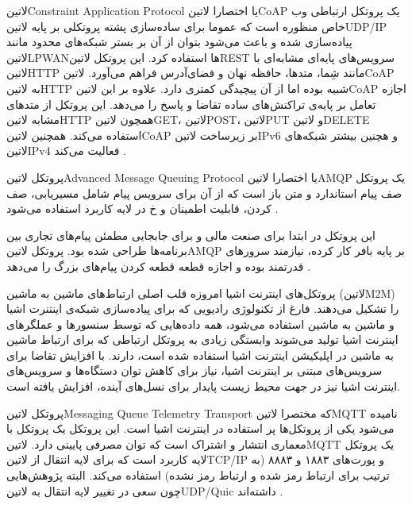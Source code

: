 
‌لاتین{Constraint Application Protocol} یا اختصارا ‌لاتین{CoAP}
یک پروتکل ارتباطی وب خاص منظوره است که عموما برای ساده‌سازی پشته پروتکلی بر پایه ‌لاتین{UDP/IP} پیاده‌سازی شده
و باعث می‌شود بتوان از آن بر بستر شبکه‌های محدود مانند ‌لاتین{LPWAN}ها استفاده کرد.
این پروتکل ‌لاتین{REST} سرویس‌های پایه‌ای مشابه‌ای با ‌لاتین{HTTP} مانند شِما، متدها، حافظه نهان و فضای‌آدرس فراهم می‌آورد.
‌لاتین{CoAP} به ‌لاتین{HTTP} شبیه بوده اما از آن پیچیدگی کمتری دارد.
علاوه بر این ‌لاتین{CoAP} اجازه تعامل بر پایه‌ی تراکنش‌های ساده تقاضا و پاسخ را می‌دهد.
این پروتکل از متدهای مشابه ‌لاتین{HTTP} همچون ‌لاتین{GET}، ‌لاتین{POST}، ‌لاتین{PUT} و ‌لاتین{DELETE} استفاده می‌کند.
همچنین ‌لاتین{CoAP} بر زیرساخت ‌لاتین{IPv6} و هچنین بیشتر شبکه‌های ‌لاتین{IPv4} فعالیت می‌کند
.


پروتکل ‌لاتین{Advanced Message Queuing Protocol} یا اختصارا ‌لاتین{AMQP} یک پروتکل صف پیام استاندارد و متن باز است
که از آن برای سرویس پیام شامل مسیریابی، صف کردن، قابلیت اطمینان و ‌خ در لایه کاربرد استفاده می‌شود
.

این پروتکل در ابتدا برای صنعت مالی و برای جابجایی مطمئن پیام‌های تجاری بین برنامه‌ها طراحی شده بود.
پروتکل ‌لاتین{AMQP} بر پایه بافر کار کرده، نیازمند سرورهای قدرتمند بوده و اجازه قطعه قطعه کردن پیام‌های بزرگ را می‌دهد
.


پروتکل‌های اینترنت اشیا امروزه قلب اصلی ارتباط‌های ماشین به ماشین (‌لاتین{M2M}) را تشکیل می‌دهند. فارغ از تکنولوژی رادیویی که برای پیاده‌سازی شبکه‌ی اینتنرت اشیا و ماشین به ماشین استفاده می‌شود، همه داده‌هایی که توسط سنسورها و عملگرهای اینترنت اشیا
تولید می‌شوند وابستگی زیادی به پروتکل ارتباطی که برای ارتباط ماشین به ماشین در اپلیکیشن اینترنت اشیا استفاده شده است، دارند.
با افزایش تقاضا برای سرویس‌های مبتنی بر اینترنت اشیا، نیاز برای کاهش توان دستگاه‌ها و سرویس‌های اینترنت اشیا نیز در جهت محیط زیست پایدار برای نسل‌های آینده، افزایش یافته است.

پروتکل ‌لاتین{Messaging Queue Telemetry Transport} که مختصرا ‌لاتین{MQTT} نامیده می‌شود یکی از پروتکل‌ها پر استفاده در اینترنت اشیا است.
این پروتکل یک پروتکل با معماری انتشار و اشتراک است که توان مصرفی پایینی دارد.
‌لاتین{MQTT} یک پروتکل لایه کاربرد است که برای لایه انتقال از ‌لاتین{TCP/IP} و پورت‌های ۱۸۸۳ و ۸۸۸۳ (به ترتیب برای ارتباط رمز شده و ارتباط رمز نشده) استفاده می‌کند. البته پژوهش‌هایی چون  سعی در تغییر لایه انتقال به ‌لاتین{UDP/Quic} داشته‌اند
.


